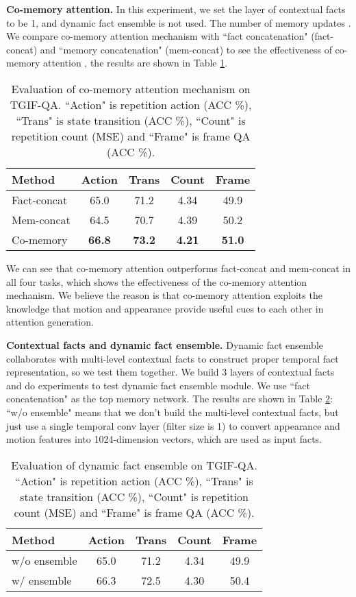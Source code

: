 \documentclass[10pt,twocolumn,letterpaper]{article}
\begin{document}
\textbf{Co-memory attention.} In this experiment, we set the layer of contextual facts to be 1, and dynamic fact ensemble is not used. The number of memory updates  . We compare co-memory attention mechanism with ``fact concatenation" (fact-concat) and ``memory concatenation" (mem-concat) to see the effectiveness of co-memory attention , the results are shown in Table \ref{tbl:comem}.
\begin{table}[h]
\centering
\caption{Evaluation of co-memory attention mechanism on TGIF-QA. ``Action" is repetition action (ACC \%), ``Trans" is state transition (ACC \%), ``Count" is repetition count (MSE) and ``Frame" is frame QA (ACC \%). }
\vspace{5pt}
\label{tbl:comem}
\begin{tabular}{l|cccc}
\hline
Method      & Action & Trans & Count & Frame \\ \hline
Fact-concat &    65.0    &  71.2     &    4.34   &     49.9  \\ \hline
Mem-concat  &   64.5     &  70.7    &   4.39    &    50.2   \\ \hline
Co-memory   &    \textbf{66.8} & \textbf{73.2}   &  \textbf{4.21}    &    \textbf{51.0}   \\ \hline
\end{tabular}
\end{table}
We can see that co-memory attention outperforms fact-concat and mem-concat in all four tasks, which shows the effectiveness of the co-memory attention mechanism. We believe the reason is that co-memory attention exploits the knowledge that motion and appearance provide useful cues to each other in attention generation. 




\textbf{Contextual facts and dynamic fact ensemble.} Dynamic fact ensemble collaborates with multi-level contextual facts to construct proper temporal fact representation, so we test them together. We build 3 layers of contextual facts and do experiments to test dynamic fact ensemble module. We use ``fact concatenation" as the top memory network. The results are shown in Table \ref{tbl:facts}: ``w/o ensemble" means that we don't build the multi-level contextual facts, but just use a single temporal conv layer (filter size is 1) to convert appearance and motion features into 1024-dimension vectors, which are used as input facts. 

\begin{table}[h]
\centering
\caption{ Evaluation of dynamic fact ensemble on TGIF-QA. ``Action" is repetition action (ACC \%), ``Trans" is state transition (ACC \%), ``Count" is repetition count (MSE) and ``Frame" is frame QA (ACC \%). }
\vspace{5pt}
\label{tbl:facts}
\begin{tabular}{l|cccc}
\hline
Method      & Action & Trans & Count & Frame \\ \hline
w/o ensemble &   65.0    &  71.2     &    4.34   &     49.9       \\ \hline
w/ ensemble   &    66.3    &    72.5   &  4.30     &  50.4     \\ \hline
\end{tabular}
\end{table}
\end{document}
